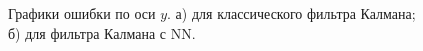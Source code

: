 \documentclass[a4paper,11pt]{article} %
\begin{document}
 \begin{figure}[h]
\begin{minipage}[h]{0.49\linewidth}
\end{minipage}
\hfill
\begin{minipage}[h]{0.49\linewidth}
\end{minipage}
\caption{Графики ошибки по оси $y$. а) для классического фильтра Калмана; б) для фильтра Калмана с NN.}
\label{batly}
\end{figure}

\newpage
\end{document}
